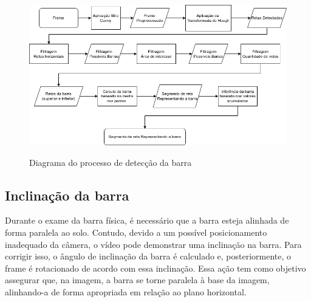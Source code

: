 \begin{figure}[H]
	\centering
    \caption{Diagrama do processo de detecção da barra}
	\includegraphics[scale=0.6]{figuras/diagrama/detectar barra.png}
	\label{diagrama:Detectar barra}
\end{figure}


\subsection[Inclinação da barra]{Inclinação da barra}\label{sec:Inclinacao da barra}

Durante o exame da barra física, é necessário que a barra esteja alinhada de forma paralela ao solo. Contudo, devido a um possível posicionamento inadequado da câmera, o vídeo pode demonstrar uma inclinação na barra. Para corrigir isso, o ângulo de inclinação da barra é calculado e, posteriormente, o frame é rotacionado de acordo com essa inclinação. Essa ação tem como objetivo assegurar que, na imagem, a barra se torne paralela à base da imagem, alinhando-a de forma apropriada em relação ao plano horizontal.


